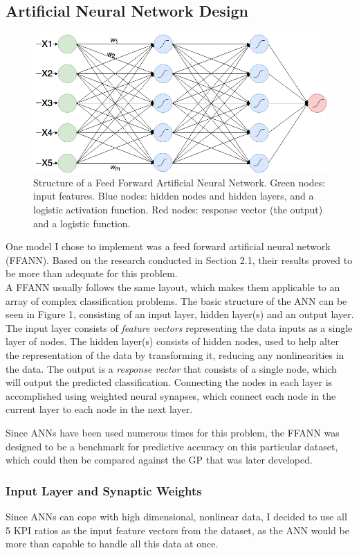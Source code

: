 \documentclass[11pt]{article}
\begin{document}
\subsection{Artificial Neural Network Design}
\begin{figure}[h]
\centering
\captionsetup{justification=centering}
\includegraphics[scale = .37]{ANN}
\caption{Structure of a Feed Forward Artificial Neural Network. Green nodes: input features. Blue nodes: hidden nodes and hidden layers, and a logistic activation function. Red nodes: response vector (the output) and a logistic function.} 
\end{figure}
One model I chose to implement was a feed forward artificial neural network (FFANN). Based on the research conducted in Section 2.1, their results proved to be more than adequate for this problem.\\
A FFANN usually follows the same layout, which makes them applicable to an array of complex classification problems. The basic structure of the ANN can be seen in Figure 1, consisting of an input layer, hidden layer(s) and an output layer. The input layer consists of \textit{feature vectors} representing the data inputs as a single layer of nodes. The hidden layer(s) consists of hidden nodes, used to help alter the representation of the data by transforming it, reducing any nonlinearities in the data. The output is a \textit{response vector} that consists of a single node, which will output the predicted classification. Connecting the nodes in each layer is accomplished using weighted neural synapses, which connect each node in the current layer to each node in the next layer. 

Since ANNs have been used numerous times for this problem, the FFANN was designed to be a benchmark for predictive accuracy on this particular dataset, which could then be compared against the GP that was later developed. 
\subsubsection{Input Layer and Synaptic Weights}\label{subsubsec:inputLayer}
Since ANNs can cope with high dimensional, nonlinear data, I decided to use all 5 KPI ratios as the input feature vectors from the dataset, as the ANN would be more than capable to handle all this data at once.
\end{document}
